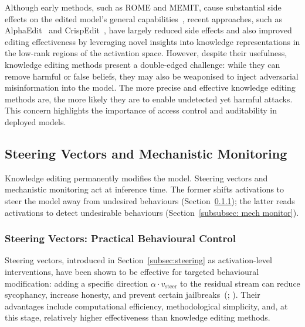 Although early methods, such as ROME and MEMIT, cause substantial side effects on the edited model's general capabilities~, recent approaches, such as AlphaEdit~ and CrispEdit~, have largely reduced side effects and also improved editing effectiveness by leveraging novel insights into knowledge representations in the low-rank regions of the activation space. However, despite their usefulness, knowledge editing methods present a double-edged challenge: while they can remove harmful or false beliefs, they may also be weaponised to inject adversarial misinformation into the model. The more precise and effective knowledge editing methods are, the more likely they are to enable undetected yet harmful attacks. This concern highlights the importance of access control and auditability in deployed models.

\subsection{Steering Vectors and Mechanistic Monitoring}
Knowledge editing permanently modifies the model. Steering vectors and mechanistic monitoring act at inference time. The former shifts activations to steer the model away from undesired behaviours (Section~\ref{subsubsec: steering vectors}); the latter reads activations to detect undesirable behaviours (Section~\ref{subsubsec: mech monitor}).

\subsubsection{Steering Vectors: Practical Behavioural Control}
\label{subsubsec: steering vectors}

Steering vectors, introduced in Section~\ref{subsec:steering} as activation-level interventions, have been shown to be effective for targeted behavioural modification: adding a specific direction $\alpha \cdot v_{\text{steer}}$ to the residual stream can reduce sycophancy, increase honesty, and prevent certain jailbreaks~(; ). Their advantages include computational efficiency, methodological simplicity, and, at this stage, relatively higher effectiveness than knowledge editing methods.

